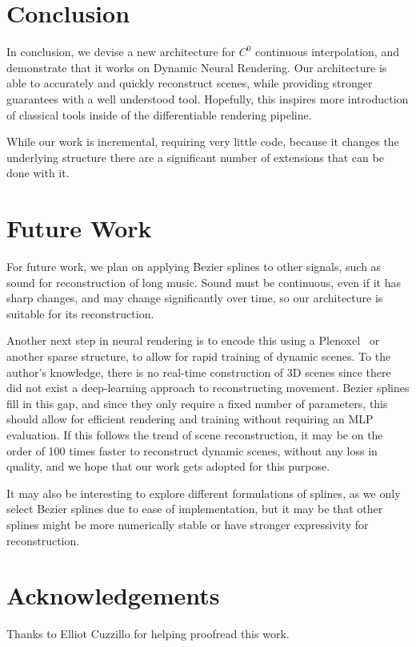 \section*{Conclusion}

In conclusion, we devise a new architecture for $C^0$ continuous interpolation, and demonstrate
that it works on Dynamic Neural Rendering. Our architecture is able to accurately and quickly
reconstruct scenes, while providing stronger guarantees with a well understood tool.
Hopefully, this inspires more introduction of classical tools inside of the differentiable rendering pipeline.

While our work is incremental, requiring very little code, because it changes the underlying structure there are a significant number of extensions that can be done with it.

\section*{Future Work}

For future work, we plan on applying Bezier splines to other signals, such as sound for
reconstruction of long music. Sound must be continuous, even if it has sharp changes, and may change significantly over time, so our architecture is suitable for its reconstruction.

Another next step in neural rendering is to encode this using a Plenoxel~\cite{yu2021plenoxels} or another sparse structure, to allow for rapid training of dynamic scenes. To the author's knowledge, there is no real-time construction of 3D scenes since there did not exist a deep-learning approach to reconstructing movement. Bezier splines fill in this gap, and since they only require a fixed number of parameters, this should allow for efficient rendering and training without requiring an MLP evaluation. If this follows the trend of scene reconstruction, it may be on the order of 100 times faster to reconstruct dynamic scenes, without any loss in quality, and we hope that our work gets adopted for this purpose.

It may also be interesting to explore different formulations of splines, as we only select
Bezier splines due to ease of implementation, but it may be that other splines might be more
numerically stable or have stronger expressivity for reconstruction.

\section*{Acknowledgements}

Thanks to Elliot Cuzzillo for helping proofread this work.